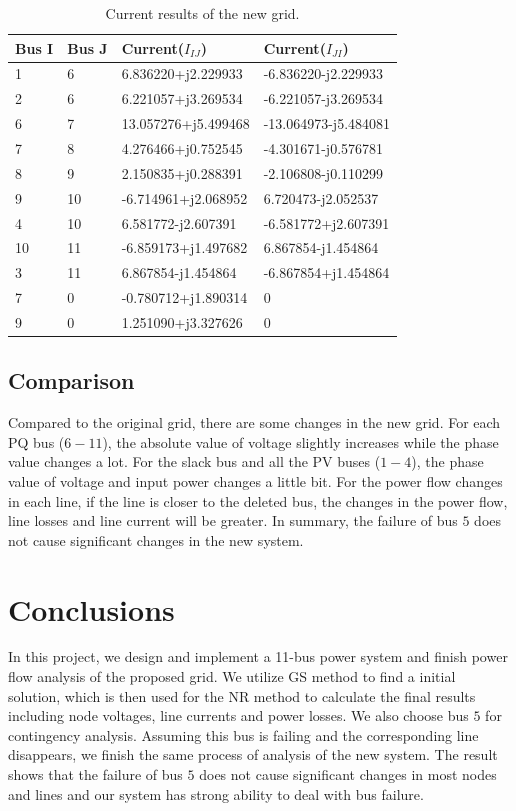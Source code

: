 \documentclass[conference]{IEEEtran}
\begin{document}
\begin{table}[H]
	\begin{center}
		\begin{tabular}{|l|l|l|l|}
			\hline
			Bus I & Bus J & Current($I_{IJ}$) & Current($I_{JI}$) \\ \hline
			1 & 6 & 6.836220+j2.229933 & -6.836220-j2.229933 \\ \hline
			2 & 6 & 6.221057+j3.269534 & -6.221057-j3.269534 \\ \hline
			6 & 7 & 13.057276+j5.499468 & -13.064973-j5.484081 \\ \hline
			7 & 8 & 4.276466+j0.752545 & -4.301671-j0.576781 \\ \hline
			8 & 9 & 2.150835+j0.288391 & -2.106808-j0.110299 \\ \hline
			9 & 10 & -6.714961+j2.068952 & 6.720473-j2.052537 \\ \hline
			4 & 10 & 6.581772-j2.607391 & -6.581772+j2.607391 \\ \hline
			10 & 11 & -6.859173+j1.497682 & 6.867854-j1.454864 \\ \hline
			3 & 11 & 6.867854-j1.454864 & -6.867854+j1.454864 \\ \hline
			7 & 0 & -0.780712+j1.890314 & 0 \\ \hline
			9 & 0 & 1.251090+j3.327626 & 0 \\ \hline
		\end{tabular}
	\end{center}
	\caption{Current results of the new grid.}
	\vspace{-6mm}
	\label{tab:c2}
\end{table}

\subsection{Comparison}
Compared to the original grid, there are some changes in the new grid. For each PQ bus ($6-11$), the absolute value of voltage slightly increases while the phase value changes a lot. For the slack bus and all the PV buses ($1-4$), the phase value of voltage and input power changes a little bit. For the power flow changes in each line, if the line is closer to the deleted bus, the changes in the power flow, line losses and line current will be greater. In summary, the failure of bus $5$ does not cause significant changes in the new system.


\section{Conclusions}
In this project, we design and implement a 11-bus power system and finish power flow analysis of the proposed grid. We utilize GS method to find a initial solution, which is then used for the NR method to calculate the final results including node voltages, line currents and power losses. We also choose bus $5$ for contingency analysis. Assuming this bus is failing and the corresponding line disappears, we finish the same process of analysis of the new system. The result shows that the failure of bus $5$ does not cause significant changes in most nodes and lines and our system has strong ability to deal with bus failure.
\end{document}
